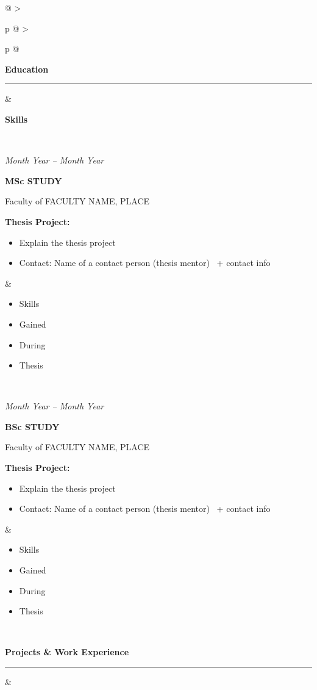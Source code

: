 \documentclass[a4paper,10pt]{article}
\makeatletter
\newlength{\skillsw}
\newlength{\midsep}
\newlength{\leftw}
\newcommand{\datew}{1.5cm}
\newcommand{\entrygap}{12pt}
\newcommand{\cell}[1]{\begin{minipage}[t]{\linewidth}\vspace{0pt}#1\end{minipage}}
\newcommand{\cvsectionleft}[1]{%
  {\large\bfseries #1\par}%
  \vspace{2pt}\rule{\linewidth}{0.4pt}\vspace{6pt}%
}
\newcommand{\datedentry}[4]{%
  \noindent
  \begin{minipage}[t]{\datew}
    {\small\textit{#1}}
  \end{minipage}%
  \hspace{0.8em}%
  \begin{minipage}[t]{\dimexpr\linewidth-\datew-0.8em\relax}
    \textbf{#2}\par
    {\small #3}\par
    #4
  \end{minipage}\par
}
\newcommand{\skillslist}[1]{%
  \small
  \begin{itemize}[leftmargin=1.2em, itemsep=1pt, topsep=1pt]
    #1
  \end{itemize}
}
\newenvironment{grayblock}{%
  \renewcommand{\arraystretch}{1.05}%
  \begin{longtable}{@{}%
    >{\raggedright\arraybackslash}p{\leftw}%
    @{\hspace{\midsep}}%
    >{\raggedright\arraybackslash\columncolor{black!8}}p{\skillsw}%
    @{}}
}{%
  \end{longtable}
}
\makeatother
\begin{document}
\begin{grayblock}


\cell{\cvsectionleft{Education}} &
\cell{\small\textbf{Skills}}\\[4pt]


\cell{\datedentry{Month Year -- Month Year}{MSc STUDY}{Faculty of FACULTY NAME, PLACE}{
  \textbf{Thesis Project:}
  \begin{itemize}
    \item Explain the thesis project
    \item Contact: Name of a contact person (thesis mentor) \faPhone\ + contact info
  \end{itemize}
}} &
\cell{\skillslist{
  \item Skills
  \item Gained
  \item During 
  \item Thesis
}}\\[\entrygap]

\cell{\datedentry{Month Year -- Month Year}{BSc STUDY}{Faculty of FACULTY NAME, PLACE}{
  \textbf{Thesis Project:}
  \begin{itemize}
    \item Explain the thesis project
    \item Contact: Name of a contact person (thesis mentor) \faPhone\ + contact info
  \end{itemize}
}} &
\cell{\skillslist{
  \item Skills
  \item Gained
  \item During 
  \item Thesis
}}\\[\entrygap]


\cell{\cvsectionleft{Projects \& Work Experience}} &
\cell{}\\[4pt]



\end{grayblock}
\end{document}
